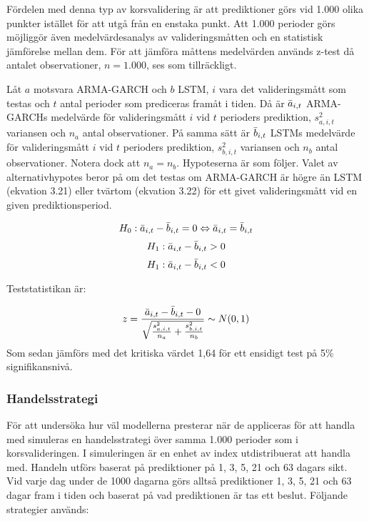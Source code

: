\documentclass[11pt]{article}
\numberwithin{equation}{section}
\numberwithin{table}{section}
\numberwithin{figure}{section}
\begin{document}
Fördelen med denna typ av korsvalidering är att prediktioner görs vid 1.000 olika punkter istället för att utgå från en enstaka punkt. Att 1.000 perioder görs möjliggör även medelvärdesanalys av valideringsmåtten och en statistisk jämförelse mellan dem. För att jämföra måttens medelvärden används z-test då antalet observationer, $n=1.000$, ses som tillräckligt.

Låt $a$ motsvara ARMA-GARCH och $b$ LSTM, $i$ vara det valideringsmått som testas och $t$ antal perioder som prediceras framåt i tiden. Då är $\Bar{a}_{i,t}$ ARMA-GARCHs medelvärde för valideringsmått $i$ vid $t$ perioders prediktion, $s_{a,i,t}^2$ variansen och $n_a$ antal observationer. På samma sätt är  $\Bar{b}_{i,t}$ LSTMs medelvärde för valideringsmått $i$ vid $t$ perioders prediktion, $s_{b,i,t}^2$ variansen och $n_b$ antal observationer. Notera dock att $n_a = n_b$. Hypoteserna är som följer. Valet av alternativhypotes beror på om det testas om ARMA-GARCH är högre än LSTM (ekvation 3.21) eller tvärtom (ekvation 3.22) för ett givet valideringsmått vid en given prediktionsperiod. 

\begin{equation}
    H_0: \Bar{a}_{i,t} - \Bar{b}_{i,t} = 0 \Leftrightarrow \Bar{a}_{i,t} = \Bar{b}_{i,t}
\end{equation}
\begin{equation}
    H_1: \Bar{a}_{i,t} - \Bar{b}_{i,t} > 0
\end{equation}
\begin{equation}
    H_1: \Bar{a}_{i,t} - \Bar{b}_{i,t} < 0
\end{equation}

Teststatistikan är: 

\begin{equation}
    z = \frac{\Bar{a}_{i,t} - \Bar{b}_{i,t} - 0}{\sqrt{\frac{s_{a,i,t}^2}{n_a}+\frac{s_{b,i,t}^2}{n_b}}} \sim N(0,1)
\end{equation}
Som sedan jämförs med det kritiska värdet 1,64 för ett ensidigt test på 5\% signifikansnivå.


\subsubsection{Handelsstrategi}
För att undersöka hur väl modellerna presterar när de appliceras för att handla med simuleras en handelsstrategi över samma 1.000 perioder som i korsvalideringen. I simuleringen är en enhet av index utdistribuerat att handla med. Handeln utförs baserat på prediktioner på 1, 3, 5, 21 och 63 dagars sikt. Vid varje dag under de 1000 dagarna görs alltså prediktioner 1, 3, 5, 21 och 63 dagar fram i tiden och baserat på vad prediktionen är tas ett beslut. Följande strategier används:
\end{document}
